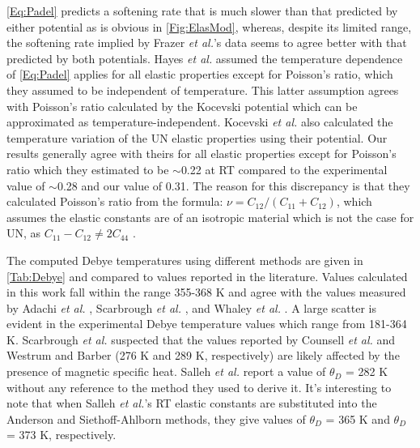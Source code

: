 \documentclass[preprint, 12pt]{elsarticle}
\begin{document}
\cref{Eq:Padel} predicts a softening rate that is much slower than that predicted by either potential as is obvious in \cref{Fig:ElasMod}, whereas, despite its limited range, the softening rate implied by Frazer \textit{et al.}'s data \cite{Frazer2021} seems to agree better with that predicted by both potentials. Hayes \textit{et al.} \cite{Hayes1990II} assumed the temperature dependence of \cref{Eq:Padel} applies for all elastic properties except for Poisson's ratio, which they assumed to be independent of temperature. This latter assumption agrees with Poisson's ratio calculated by the Kocevski potential which can be approximated as temperature-independent. Kocevski \textit{et al.} \cite{Kocevski2022II} also calculated the temperature variation of the UN elastic properties using their potential. Our results generally agree with theirs for all elastic properties except for Poisson's ratio which they estimated to be $\sim$0.22 at RT compared to the experimental value of $\sim$0.28 and our value of 0.31. The reason for this discrepancy is that they calculated Poisson's ratio from the formula: $\nu = C_{12}/\left( C_{11}+C_{12} \right)$, which assumes the elastic constants are of an isotropic material which is not the case for UN, as $C_{11}-C_{12} \neq 2C_{44}$ \cite{Salleh1986, Zener1947}.

The computed Debye temperatures using different methods are given in \cref{Tab:Debye} and compared to values reported in the literature. Values calculated in this work fall within the range 355-368 K and agree with the values measured by Adachi \textit{et al.} \cite{Adachi2009}, Scarbrough \textit{et al.} \cite{Scarbrough1968}, and Whaley \textit{et al.} \cite{Whaley1969}. A large scatter is evident in the experimental Debye temperature values which range from 181-364 K. Scarbrough \textit{et al.} \cite{Scarbrough1968} suspected that the values reported by Counsell \textit{et al.} \cite{Counsell1964} and Westrum and Barber \cite{Westrum1966} (276 K and 289 K, respectively) are likely affected by the presence of magnetic specific heat. Salleh \textit{et al.} \cite{Salleh1986} report a value of $\theta_D$ = 282 K without any reference to the method they used to derive it. It's interesting to note that when Salleh \textit{et al.}'s RT elastic constants are substituted into the Anderson and Siethoff-Ahlborn methods, they give values of $\theta_D$ = 365 K and $\theta_D$ = 373 K, respectively.
\end{document}
